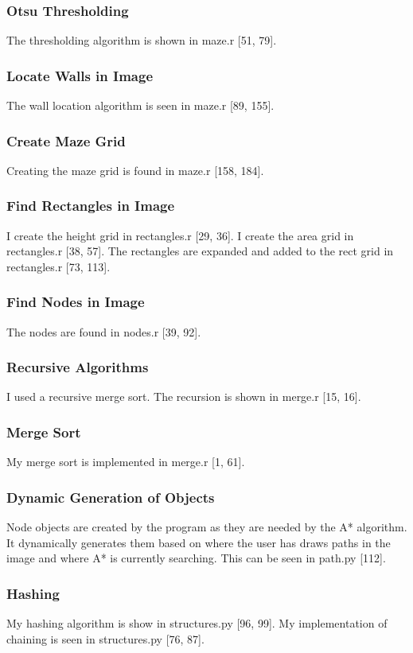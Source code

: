 \documentclass[titlepage]{article}
\begin{document}
\subsubsection{Otsu Thresholding}
The thresholding algorithm is shown in maze.r [51, 79].
\subsubsection{Locate Walls in Image}
The wall location algorithm is seen in maze.r [89, 155].
\subsubsection{Create Maze Grid}
Creating the maze grid is found in maze.r [158, 184].
\subsubsection{Find Rectangles in Image}
I create the height grid in rectangles.r [29, 36]. I create the area grid in rectangles.r [38, 57]. The rectangles are expanded and added to the rect grid in rectangles.r [73, 113].
\subsubsection{Find Nodes in Image}
The nodes are found in nodes.r [39, 92].
\subsubsection{Recursive Algorithms}
I used a recursive merge sort. The recursion is shown in merge.r [15, 16].
\subsubsection{Merge Sort}
My merge sort is implemented in merge.r [1, 61].
\subsubsection{Dynamic Generation of Objects}
Node objects are created by the program as they are needed by the A* algorithm. It dynamically generates them based on where the user has draws paths in the image and where A* is currently searching. This can be seen in path.py [112]. 
\subsubsection{Hashing}
My hashing algorithm is show in structures.py [96, 99]. My implementation of chaining is seen in structures.py [76, 87].
\end{document}
